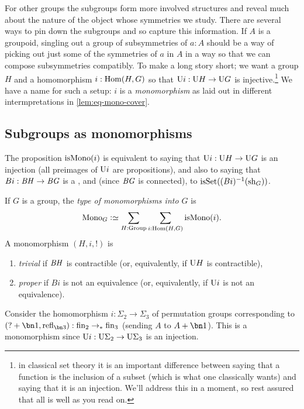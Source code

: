 For other groups the subgroups form more involved structures and reveal much about the nature of the object whose symmetries we study.
There are several ways to pin down the subgroups and so capture this information.
If $A$ is a groupoid, singling out a group of subsymmetries of $a:A$ should be a way of picking out just some of the symmetries of $a$ in $A$ in a way so that we can compose subsymmetries compatibly.  To make a long story short; we want a group $H$ and a homomorphism $i:\Hom(H,G)$ so that $\mathrm{U} i:\mathrm{U} H\to\mathrm{U} G$ is injective.\footnote{in classical set theory it is an important difference between saying that a function is the inclusion of a subset (which is what one classically wants) and saying that it is an injection.  We'll address this in a moment, so rest assured that all is well as you read on.}  We have a name for such a setup: $i$ is a \emph{monomorphism} as laid out in different intermpretations in \cref{lem:eq-mono-cover}.

\subsection{Subgroups as monomorphisms}

The proposition $\ismono(i)$ is equivalent to saying that $\mathrm{U} i:\mathrm{U} H\to \mathrm{U} G$ is an injection (all preimages of $\mathrm{U} i$ are propositions), and also to saying that $B i:\mathit{B}\mathit{H}\to\mathit{B}\mathit{G}$ is a \covering, and (since $\mathit{B}\mathit{G}$ is connected), to $\isset((Bi)^{-1}(\shape_G))$.
\begin{definition}
  \label{def:typeofmono}
  If $G$ is a group, the \emph{type of monomorphisms into $G$} is
  $$\typemono_G\defequi\sum_{H:\typegroup}\sum_{i:\Hom(H,G)}\ismono(i).$$
  A monomorphism $(H,i,!)$ is
      \begin{enumerate}
      \item \emph{trivial} if $\mathit{B}\mathit{H}$ is contractible (or, equivalently, if $\mathrm{U} H$ is contractible),
      \item \emph{proper} if $Bi$ is not an equivalence (or, equivalently, if $\mathrm{U} i$ is not an equivalence).
      \end{enumerate}
\end{definition}

\begin{example}
  \label{ex:sigma2inSigma3}
  Consider the  homomorphism $i:\Sigma_2\to\Sigma_3$ of permutation groups corresponding to $(?+\bn 1,\refl{\bn 3}):\fin_2\to_*\fin_3$ (sending $A$ to $A+\bn 1$).  This is a monomorphism since $\mathrm{U} i:\mathrm{U}\Sigma_2\to\mathrm{U}\Sigma_3$ is an injection.
\end{example}


